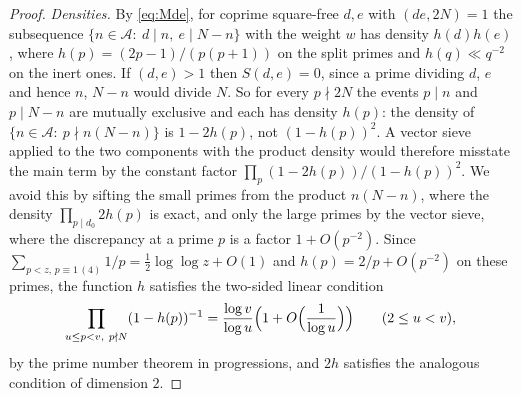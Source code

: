 \documentclass[11pt]{amsart}
\theoremstyle{remark}
\newcommand{\cA}{\mathcal{A}}
\begin{document}
\begin{proof}
\emph{Densities.} By \eqref{eq:Mde}, for coprime square-free $d,e$ with $(de,2N)=1$ the subsequence $\{n\in\cA:\ d\mid n,\ e\mid N-n\}$ with the weight $w$ has density $h(d)h(e)$, where $h(p)=(2p-1)/(p(p+1))$ on the split primes and $h(q)\ll q^{-2}$ on the inert ones. If $(d,e)>1$ then $S(d,e)=0$, since a prime dividing $d$, $e$ and hence $n$, $N-n$ would divide $N$. So for every $p\nmid 2N$ the events $p\mid n$ and $p\mid N-n$ are mutually exclusive and each has density $h(p)$: the density of $\{n\in\cA:\ p\nmid n(N-n)\}$ is $1-2h(p)$, not $(1-h(p))^2$. A vector sieve applied to the two components with the product density would therefore misstate the main term by the constant factor $\prod_p(1-2h(p))/(1-h(p))^2$. We avoid this by sifting the small primes from the product $n(N-n)$, where the density $\prod_{p\mid d_0}2h(p)$ is exact, and only the large primes by the vector sieve, where the discrepancy at a prime $p$ is a factor $1+O(p^{-2})$. Since $\sum_{p<z,\,p\equiv1\,(4)}1/p=\frac12\log\log z+O(1)$ and $h(p)=2/p+O(p^{-2})$ on these primes, the function $h$ satisfies the two-sided linear condition
\begin{equation}\label{eq:lincond}
\prod_{u\le p<v,\ p\nmid N}(1-h(p))^{-1}=\frac{\log v}{\log u}\Bigl(1+O\Bigl(\frac1{\log u}\Bigr)\Bigr)\qquad(2\le u<v),
\end{equation}
by the prime number theorem in progressions, and $2h$ satisfies the analogous condition of dimension $2$.


\end{proof}
\end{document}
